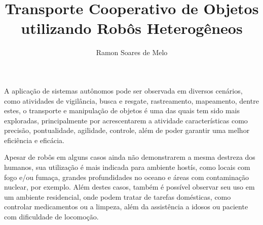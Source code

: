 \documentclass[12pt]{article}
\title{Transporte Cooperativo de Objetos utilizando Robôs Heterogêneos}
\author{Ramon Soares de Melo}
\begin{document}
\maketitle




\footnotesize


A aplicação de sistemas autônomos pode ser observada em diversos cenários, como atividades de vigilância, busca e resgate, rastreamento, mapeamento, dentre estes, o transporte e manipulação de objetos é uma das quais tem sido mais exploradas, principalmente por acrescentarem a atividade características como precisão, pontualidade, agilidade, controle, além de poder garantir uma melhor eficiência e eficácia.

Apesar de robôs em alguns casos ainda não demonstrarem a mesma destreza dos humanos, sua utilização é mais indicada para ambiente hostís, como locais com fogo e/ou fumaça, grandes profundidades no oceano e áreas com contaminação nuclear, por exemplo.
Além destes casos, também é possível observar seu uso em um ambiente residencial, onde podem tratar de tarefas domésticas, como controlar medicamentos ou a limpeza, além da assistência a idosos ou paciente com dificuldade de locomoção.


\end{document}
